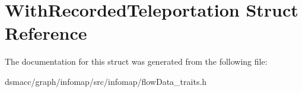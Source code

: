 \hypertarget{structWithRecordedTeleportation}{}\section{With\+Recorded\+Teleportation Struct Reference}
\label{structWithRecordedTeleportation}


The documentation for this struct was generated from the following file\+:\begin{DoxyCompactItemize}
\item 
dsmacc/graph/infomap/src/infomap/flow\+Data\+\_\+traits.\+h\end{DoxyCompactItemize}
